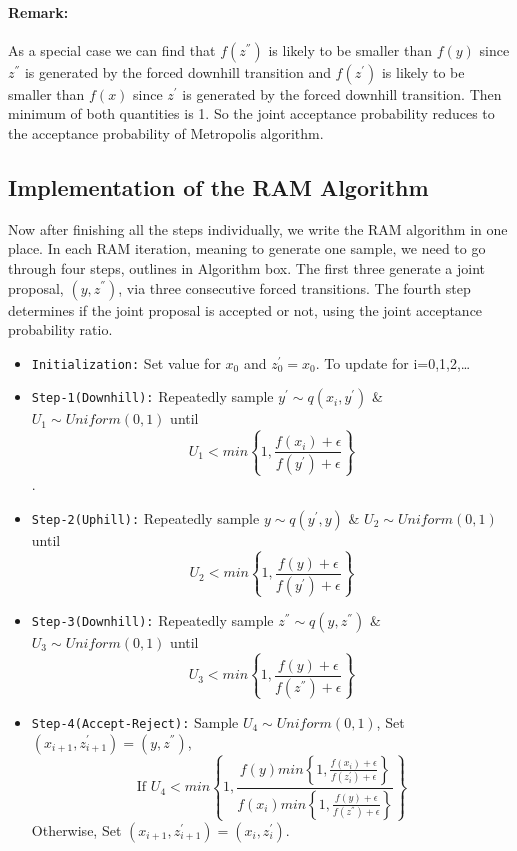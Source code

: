 \documentclass{article}
\begin{document}
\paragraph{Remark:}As a special case we can find that $f(z^{''})$ is likely to be smaller than $f(y)$ since $z^{''}$ is generated by the forced downhill transition and $f(z^{'})$ is likely to be smaller than $f(x)$ since $z^{'}$ is generated by the forced downhill transition. Then minimum of both quantities is 1. So the joint acceptance probability reduces to the acceptance probability of Metropolis algorithm.

\subsection{Implementation of the RAM Algorithm}
Now after finishing all the steps individually, we write the RAM algorithm in one place. In each RAM iteration, meaning to generate one sample, we need to go through four steps, outlines in Algorithm box. The first three generate a joint proposal, $(y,z^{''})$, via three consecutive forced transitions. The fourth step determines if the joint proposal is accepted or not, using the joint acceptance probability ratio.
\begin{tcolorbox}[colback=blue!5!white,colframe=blue,title=Repelling–Attracting Metropolis Algorithm]
\begin{itemize}
    \item \texttt{Initialization:} Set value for $x_0$ and $z_0^{'}=x_0$. To update for i=0,1,2,\ldots
    \item \texttt{Step-1(Downhill):} Repeatedly sample $y^{'} \sim q(x_i,y^{'})$ \& $U_1 \sim Uniform(0,1)$ until $$U_1 < min\left\{1,\frac{f(x_i)+\epsilon}{f(y^{'})+\epsilon}\right\}$$.
    \item \texttt{Step-2(Uphill):} Repeatedly sample $y \sim q(y^{'},y)$ \& $U_2 \sim Uniform(0,1)$ until $$U_2 < min\left\{1,\frac{f(y)+\epsilon}{f(y^{'})+\epsilon}\right\}$$
    \item \texttt{Step-3(Downhill):} Repeatedly sample $z^{''} \sim q(y,z^{''})$ \& $U_3 \sim Uniform(0,1)$ until $$U_3 < min\left\{1,\frac{f(y)+\epsilon}{f(z^{''})+\epsilon}\right\}$$
    \item \texttt{Step-4(Accept-Reject):} Sample $U_4 \sim Uniform(0,1)$, Set $(x_{i+1},z_{i+1}^{'})=(y,z^{''})$, $$\text{If  } U_4 < min\left\{1,\frac{f(y)min\left\{1,\frac{f(x_i)+\epsilon}{f(z_i^{'})+\epsilon}\right\}}{f(x_i)min\left\{1,\frac{f(y)+\epsilon}{f(z^{''})+\epsilon}\right\}}\right\}$$
    Otherwise, Set $(x_{i+1},z_{i+1}^{'})=(x_i,z_i^{'})$.
\end{itemize}
\end{tcolorbox}
\clearpage
\end{document}
